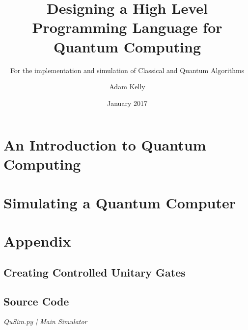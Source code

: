 \documentclass{scrartcl}
\title{Designing a High Level Programming Language for Quantum Computing}
\subtitle{For the implementation and simulation of Classical and Quantum Algorithms}
\author{Adam Kelly}
\date{January 2017}
\begin{document}
\begin{titlepage}
\maketitle
\end{titlepage}

\newpage
\tableofcontents
\newpage

\section{An Introduction to Quantum Computing}


\section{Simulating a Quantum Computer}


\newpage
\section{Appendix}
\subsection{Creating Controlled Unitary Gates}


\subsection{Source Code}

\emph{QuSim.py | Main Simulator}
%

\newpage
\printbibliography
\newpage
\end{document}
